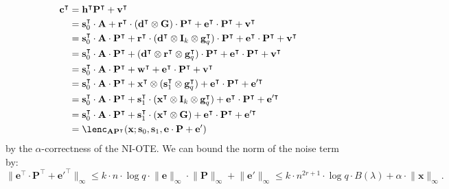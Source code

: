\documentclass{theoretics}
\newcommand{\id}{\ensuremath{\mathbf{I}}}
\begin{document}
    \begin{align*}\mathbf{c}^\intercal&=\mathbf{h}^\intercal \mathbf{P}^\intercal+\mathbf{v}^\intercal\\
    &=\mathbf{s}_0^\intercal\cdot \mathbf{A}+\mathbf{r}^\intercal\cdot(\mathbf{d}^\intercal \otimes \mathbf{G})\cdot \mathbf{P}^\intercal+\mathbf{e}^\intercal\cdot \mathbf{P}^\intercal+\mathbf{v}^\intercal\\
    &=\mathbf{s}_0^\intercal\cdot \mathbf{A}\cdot \mathbf{P}^\intercal+\mathbf{r}^\intercal\cdot (\mathbf{d}^\intercal \otimes \id_k\otimes \mathbf{g}_q^\intercal)\cdot \mathbf{P}^\intercal+\mathbf{e}^\intercal\cdot \mathbf{P}^\intercal+\mathbf{v}^\intercal\\
    &=\mathbf{s}_0^\intercal\cdot \mathbf{A}\cdot \mathbf{P}^\intercal+(\mathbf{d}^\intercal \otimes \mathbf{r}^\intercal\otimes \mathbf{g}_q^\intercal)\cdot \mathbf{P}^\intercal+\mathbf{e}^\intercal\cdot \mathbf{P}^\intercal+\mathbf{v}^\intercal\\
    &=\mathbf{s}_0^\intercal\cdot \mathbf{A}\cdot \mathbf{P}^\intercal+{\mathbf{w}}^\intercal+\mathbf{e}^\intercal\cdot \mathbf{P}^\intercal+\mathbf{v}^\intercal\\
    &=\mathbf{s}_0^\intercal\cdot \mathbf{A}\cdot \mathbf{P}^\intercal+\mathbf{x}^\intercal\otimes (\mathbf{s}_1^\intercal\otimes \mathbf{g}_q^\intercal)+\mathbf{e}^\intercal\cdot \mathbf{P}^\intercal+\mathbf{e}'^\intercal\\
        &=\mathbf{s}_0^\intercal\cdot \mathbf{A}\cdot \mathbf{P}^\intercal+\mathbf{s}_1^\intercal\cdot (\mathbf{x}^\intercal\otimes\id_k\otimes \mathbf{g}_q^\intercal)+\mathbf{e}^\intercal\cdot \mathbf{P}^\intercal+\mathbf{e}'^\intercal\\
    &=\mathbf{s}_0^\intercal\cdot \mathbf{A}\cdot \mathbf{P}^\intercal+\mathbf{s}_1^\intercal\cdot (\mathbf{x}^\intercal\otimes \mathbf{G})+\mathbf{e}^\intercal\cdot \mathbf{P}^\intercal+\mathbf{e}'^\intercal\\
    &= \lenc_{\mathbf{A}\mathbf{P}^\intercal}(\mathbf{x}; \mathbf{s}_0, \mathbf{s}_1, \mathbf{e}\cdot \mathbf{P}+\mathbf{e}')
    \end{align*}
by the $\alpha$-correctness of the NI-OTE. We can bound the norm of the noise term by:
\[\lVert \mathbf{e}^\intercal\cdot \mathbf{P}^\intercal+\mathbf{e}'^\intercal\rVert_\infty\le k\cdot n\cdot \log q\cdot \lVert \mathbf{e}\rVert_\infty\cdot \lVert \mathbf{P}\rVert_\infty+\lVert \mathbf{e}'\rVert_\infty \le k\cdot n^{2r + 1}\cdot \log q\cdot B(\lambda) + \alpha \cdot\lVert\mathbf{x}\rVert_\infty.
\] 
\end{document}
